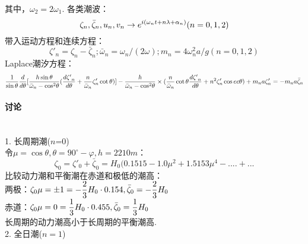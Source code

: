\documentclass[a4paper,12pt]{article}
\begin{document}
    其中，${\omega _2} = 2{\omega _1}$.
    各类潮波：
    \[
        {\zeta _n},{\bar \zeta _n},{u_n},{v_n} \to {e^{i({\omega _n}t + n\lambda  + {\alpha _n})}}{\rm{  }}(n = 0,1,2)
    \]
    带入运动方程和连续方程：
    \[
        {\zeta '_n} = {\zeta _n} - {\bar \zeta _n};  {\bar \omega _n} = {\omega _n}/(2\omega );  {m_n} = 4\omega _n^2a/g  (n = 0,1,2)
    \]
    Laplace潮汐方程：
    \[
        {1 \over {\sin \theta }}{d \over {d\theta }}[{{h\sin \theta } \over {{{\bar \omega }_n} - {{\cos }^2}\theta }}({{d{{\zeta '}_n}} \over {d\theta }} + {n \over {{{\bar \omega }_n}}}{\zeta '_n}\cot \theta )] - {h \over {{{\bar \omega }_n} - {{\cos }^2}\theta }} \times ({n \over {{{\bar \omega }_n}}}\cot \theta {{d{{\zeta '}_n}} \over {d\theta }} + {n^2}{\zeta '_n}\cos ec\theta ) + {m_n}a{\zeta '_n} =  - {m_n}a{\bar \zeta _n}
    \]
    \paragraph{讨论}~{}\\
    1. 长周期潮($n$=0)\\
    令$\mu=\cos\theta,\theta=90^\circ-\varphi,h=2210m$：
    \[
        {\zeta _0} = {\zeta '_0} + {\bar \zeta _0} = {H_0}(0.1515 - 1.0{\mu ^2} + 1.5153{\mu ^4} - .... + ...
    \]
    比较动力潮和平衡潮在赤道和极低的潮高：\\
    两极：$\displaystyle {\zeta _0}\mu  =  \pm 1 =  - {2 \over 3}{H_0} \cdot 0.154,\bar{\zeta}_0=-{2 \over 3}H_0$\\
    赤道：$\displaystyle {\zeta _0}\mu  = 0 = {1 \over 3}{H_0} \cdot 0.455,\bar{\zeta}_0={1 \over 3}H_0$\\
    长周期的动力潮高小于长周期的平衡潮高.\\
    2. 全日潮($n=1$)\\

    
	
\end{document}

